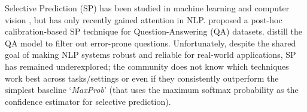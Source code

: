 \documentclass[11pt]{article}
\begin{document}
    

Selective Prediction (SP) has been studied in machine learning \cite{chow1957optimum,el2010foundations} and computer vision \cite{Geifman2017SelectiveCF, Geifman2019SelectiveNetAD}, but has only recently gained attention in NLP.
\citet{kamath-etal-2020-selective} proposed a post-hoc calibration-based SP technique for Question-Answering (QA) datasets. 
\citet{garg2021will} distill the QA model to filter out error-prone questions.
Unfortunately, despite the shared goal of making NLP systems robust and reliable for real-world applications, SP has remained underexplored; the community does not know which techniques work best across tasks/settings or even if they consistently outperform the simplest baseline `\textit{MaxProb}' \cite{hendrycks17baseline} (that uses the maximum softmax probability as the confidence estimator for selective prediction).

\end{document}
